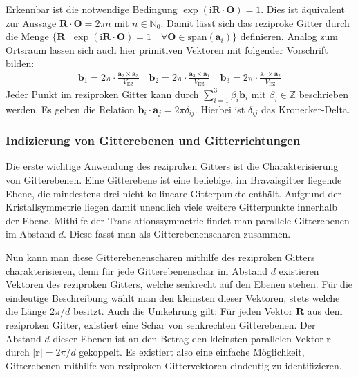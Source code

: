 Erkennbar ist die notwendige Bedingung $\exp(\mathrm{i}\mathbf{R}\cdot \mathbf{O})=1$.
Dies ist äquivalent zur Aussage $\mathbf{R}\cdot \mathbf{O}=2\pi n$ mit $n \in \mathbb{N}_{0}$.
Damit lässt sich das reziproke Gitter durch die Menge
$\{ \mathbf{R} \,\vert\, \exp(\mathrm{i}\mathbf{R}\cdot \mathbf{O})=1 \quad
\forall \mathbf{O} \in \text{span}(\mathbf{a}_{i}) \}$ definieren. \autocite[108]{Ashcroft}
Analog zum Ortsraum lassen sich auch hier primitiven Vektoren mit folgender Vorschrift bilden:
\begin{align*}
    \mathbf{b}_{1} = 2\pi \cdot \frac{\mathbf{a}_{2} \times \mathbf{a}_{3}}{V_{\mathrm{EZ}}} \quad
    \mathbf{b}_{2} = 2\pi \cdot \frac{\mathbf{a}_{3} \times \mathbf{a}_{1}}{V_{\mathrm{EZ}}} \quad
    \mathbf{b}_{3} = 2\pi \cdot \frac{\mathbf{a}_{1} \times \mathbf{a}_{2}}{V_{\mathrm{EZ}}}
\end{align*}
Jeder Punkt im reziproken Gitter kann durch $\sum_{i=1}^{3} \beta_{i}\mathbf{b}_{i}$ mit $\beta_i \in \mathbb{Z}
$ beschrieben werden.
Es gelten die Relation $\mathbf{b}_{i}\cdot \mathbf{a}_{j}=2 \pi \delta_{ij}$.
Hierbei ist $\delta_{ij}$ das Kronecker-Delta.
\autocite[109]{Ashcroft}

\subsubsection{Indizierung von Gitterebenen und Gitterrichtungen}
Die erste wichtige Anwendung des reziproken Gitters ist die Charakterisierung von Gitterebenen.
Eine Gitterebene ist eine beliebige, im Bravaisgitter liegende Ebene, die mindestens drei nicht kollineare Gitterpunkte
enthält.
Aufgrund der Kristallsymmetrie liegen damit unendlich viele weitere Gitterpunkte innerhalb der Ebene.
Mithilfe der Translationssymmetrie findet man parallele Gitterebenen im Abstand $d$.
Diese fasst man als Gitterebenenscharen zusammen.

Nun kann man diese Gitterebenenscharen mithilfe des reziproken Gitters charakterisieren, denn für jede
Gitterebenenschar im Abstand $d$ existieren Vektoren des reziproken Gitters, welche senkrecht auf den Ebenen stehen.
Für die eindeutige Beschreibung wählt man den kleinsten dieser Vektoren, stets welche die Länge $2 \pi / d$ besitzt.
Auch die Umkehrung gilt: Für jeden Vektor $\mathbf{R}$ aus dem reziproken Gitter, existiert eine Schar von senkrechten
Gitterebenen.
Der Abstand $d$ dieser Ebenen ist an den Betrag den kleinsten parallelen Vektor $\mathbf{r}$ durch $\lvert \mathbf{r}
\rvert=2\pi  /d$ gekoppelt.
Es existiert also eine einfache Möglichkeit, Gitterebenen mithilfe von reziproken Gittervektoren eindeutig zu
identifizieren. \autocite[113]{Ashcroft}

